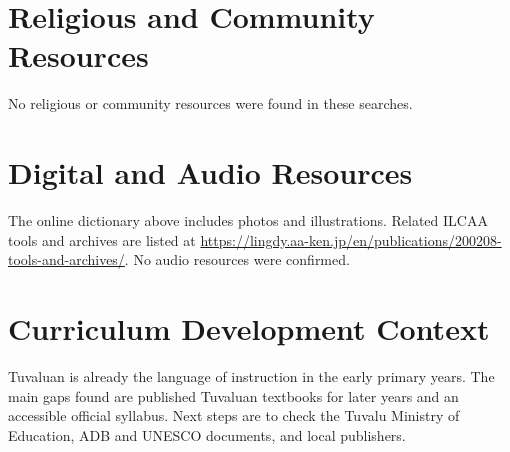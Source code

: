 \documentclass[12pt]{article}
\begin{document}
\section{Religious and Community Resources}
No religious or community resources were found in these searches.

\section{Digital and Audio Resources}
The online dictionary above includes photos and illustrations. Related ILCAA tools and archives are listed at \url{https://lingdy.aa-ken.jp/en/publications/200208-tools-and-archives/}. No audio resources were confirmed.

\section{Curriculum Development Context}
Tuvaluan is already the language of instruction in the early primary years. The main gaps found are published Tuvaluan textbooks for later years and an accessible official syllabus. Next steps are to check the Tuvalu Ministry of Education, ADB and UNESCO documents, and local publishers.
\end{document}
